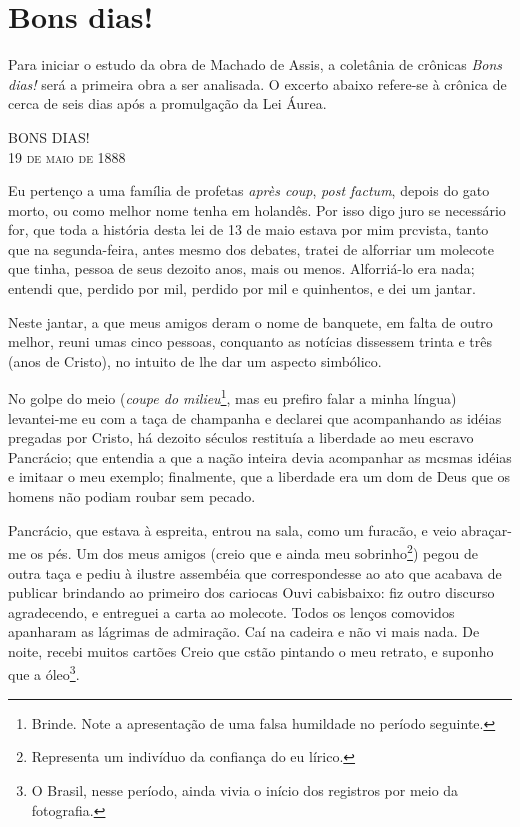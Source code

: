 
\chapter{Bons dias!}

Para iniciar o estudo da obra de Machado de Assis, a coletânia de crônicas \textit{Bons dias!} será a primeira obra a ser analisada. O excerto abaixo refere-se à crônica de cerca de seis dias após a promulgação da Lei Áurea.

\begin{corollary}{BONS DIAS!}
\\
\textsc{19 de maio de 1888}

Eu pertenço a uma família de profetas \textit{après coup}, \textit{post factum}, depois do gato morto, ou como melhor nome tenha em holandês. Por isso digo juro se necessário for, que toda a história desta lei de 13 de maio estava por mim prcvista, tanto que na segunda-feira, antes mesmo dos debates, tratei de alforriar um molecote que tinha, pessoa de seus dezoito anos, mais ou menos. Alforriá-lo era nada; entendi que, perdido por mil, perdido por mil e quinhentos, e dei um jantar.

Neste jantar, a que meus amigos deram o nome de banquete, em falta de outro melhor, reuni umas cinco pessoas, conquanto as notícias dissessem trinta e três (anos de Cristo), no intuito de lhe dar um aspecto simbólico.

No golpe do meio (\textit{coupe do milieu}\footnote{Brinde. Note a apresentação de uma falsa humildade no período seguinte.}, mas eu prefiro falar a minha língua) levantei-me eu com a taça de champanha e declarei que acompanhando as idéias pregadas por Cristo, há dezoito séculos restituía a liberdade ao meu escravo Pancrácio; que entendia a que a nação inteira devia acompanhar as mcsmas idéias e imitaar o meu exemplo; finalmente, que a liberdade era um dom de Deus que os homens não podiam roubar sem pecado.

Pancrácio, que estava à espreita, entrou na sala, como um furacão, e veio abraçar-me os pés. Um dos meus amigos (creio que e ainda meu sobrinho\footnote{Representa um indivíduo da confiança do eu lírico.}) pegou de outra taça e pediu à ilustre assembéia que correspondesse ao ato que acabava de publicar brindando ao primeiro dos cariocas Ouvi cabisbaixo: fiz outro discurso agradecendo, e entreguei a carta ao molecote. Todos os lenços comovidos apanharam as lágrimas de admiração. Caí na cadeira e não vi mais nada. De noite, recebi muitos cartões Creio que cstão pintando o meu retrato, e suponho que a óleo\footnote{O Brasil, nesse período, ainda vivia o início dos registros por meio da fotografia.}.


\end{corollary}
